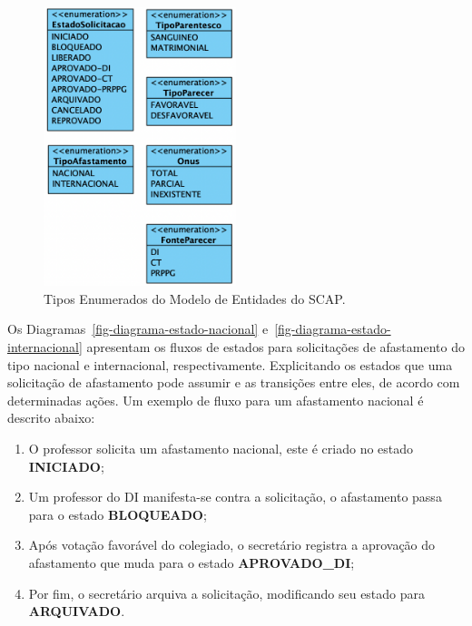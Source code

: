 
\begin{figure}
    \centering
    \includegraphics[width=0.5\textwidth]{figuras/fig-modelo-entidades-enum.png}
    \caption{Tipos Enumerados do Modelo de Entidades do SCAP.}
    \label{fig-modelo-entidades-enum}
\end{figure}


Os Diagramas~\ref{fig-diagrama-estado-nacional} e~\ref{fig-diagrama-estado-internacional} apresentam os fluxos de estados
para solicitações de afastamento do tipo nacional e internacional, respectivamente.
Explicitando os estados que uma solicitação de afastamento pode assumir e as transições entre eles,
de acordo com determinadas ações. Um exemplo de fluxo para um afastamento nacional é descrito abaixo:

\begin{enumerate}
    \item O professor solicita um afastamento nacional, este é criado no estado \textbf{INICIADO};
    \item Um professor do DI manifesta-se contra a solicitação, o afastamento passa para o estado \textbf{BLOQUEADO};
    \item Após votação favorável do colegiado, o secretário registra a aprovação do afastamento que muda para o estado \textbf{APROVADO\_DI};
    \item Por fim, o secretário arquiva a solicitação, modificando seu estado para \textbf{ARQUIVADO}.

\end{enumerate}

